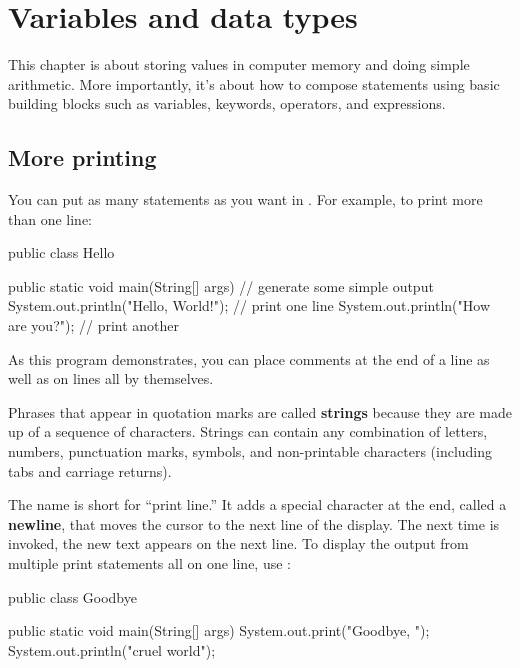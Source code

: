 \chapter{Variables and data types}

This chapter is about storing values in computer memory and doing simple arithmetic.
More importantly, it's about how to compose statements using basic building blocks such as variables, keywords, operators, and expressions.


\section{More printing}

You can put as many statements as you want in .
For example, to print more than one line:

\begin{code}
public class Hello {

    public static void main(String[] args) {
        // generate some simple output
        System.out.println("Hello, World!");  // print one line
        System.out.println("How are you?");   // print another
    }

}
\end{code}

As this program demonstrates, you can place comments at the end of a line as well as on lines all by themselves.


Phrases that appear in quotation marks are called {\bf strings} because they are made up of a sequence of characters.
Strings can contain any combination of letters, numbers, punctuation marks, symbols, and non-printable characters (including tabs and carriage returns).


The name  is short for ``print line.'' It adds a special character at the end, called a {\bf newline}, that moves the cursor to the next line of the display.
The next time  is invoked, the new text appears on the next line.
To display the output from multiple print statements all on one line, use :

\begin{code}
public class Goodbye {

    public static void main(String[] args) {
        System.out.print("Goodbye, ");
        System.out.println("cruel world");
    }

}
\end{code}

